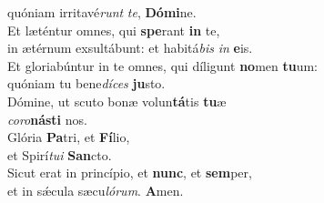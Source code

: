 \evenverse quóniam irritavé\textit{runt} \textit{te}, \textbf{Dó}\textbf{mi}ne.\\
\oddverse Et læténtur omnes, qui \textbf{spe}rant \textbf{in} te,~\*\\
\oddverse in ætérnum exsultábunt: et habitá\textit{bis} \textit{in} \textbf{e}is.\\
\evenverse Et gloriabúntur in te omnes, qui díligunt \textbf{no}men \textbf{tu}um:~\*\\
\evenverse quóniam tu bene\textit{dí}\textit{ces} \textbf{ju}sto.\\
\oddverse Dómine, ut scuto bonæ volun\textbf{tá}tis \textbf{tu}æ~\*\\
\oddverse \textit{co}\textit{ro}\textbf{ná}\textbf{sti} nos.\\
\evenverse Glória \textbf{Pa}tri, et \textbf{Fí}lio,~\*\\
\evenverse et Spirí\textit{tu}\textit{i} \textbf{San}cto.\\
\oddverse Sicut erat in princípio, et \textbf{nunc}, et \textbf{sem}per,~\*\\
\oddverse et in sǽcula sæcu\textit{ló}\textit{rum}. \textbf{A}men.\\
